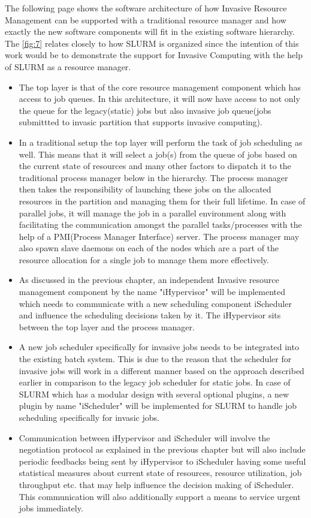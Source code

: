 The following page shows the software architecture of how Invasive Resource Management can be supported with a traditional resource manager and how exactly the new software components will fit in the existing software hierarchy. The \ref{fig:7} relates closely to how SLURM is organized since the intention of this work would be to demonstrate the support for Invasive Computing with the help of SLURM as a resource manager.
\begin{itemize}
\item The top layer is that of the core resource management component which has access to job queues. In this architecture, it will now have access to not only the queue for the legacy(static) jobs but also invasive job queue(jobs submittted to invasic partition that supports invasive computing).
\item In a traditional setup the top layer will perform the task of job scheduling as well. This means that it will select a job(s) from the queue of jobs based on the current state of resources and many other factors to dispatch it to the traditional process manager below in the hierarchy. The process manager then takes the responsibility of launching these jobs on the allocated resources in the partition and managing them for their full lifetime. In case of parallel jobs, it will manage the job in a parallel environment along with facilitating the communication amongst the parallel tasks/processes with the help of a PMI(Process Manager Interface) server. The process manager may also spawn slave daemons on each of the nodes which are a part of the resource allocation for a single job to manage them more effectively.
\item As discussed in the previous chapter, an independent Invasive resource management component by the name "iHypervisor" will be implemented which needs to communicate with a new scheduling component iScheduler and influence the scheduling decisions taken by it. The iHypervisor sits between the top layer and the process manager.
\item A new job scheduler specifically for invasive jobs needs to be integrated into the existing batch system. This is due to the reason that the scheduler for invasive jobs will work in a different manner based on the approach described earlier in comparison to the legacy job scheduler for static jobs. In case of SLURM which has a modular design with several optional plugins, a new plugin by name "iScheduler" will be implemented for SLURM to handle job scheduling specifically for invasic jobs.
\item Communication between iHypervisor and iScheduler will involve the negotiation protocol as explained in the previous chapter but will also include periodic feedbacks being sent by iHypervisor to iScheduler having some useful statistical measures about current state of resources, resource utilization, job throughput etc. that may help influence the decision making of iScheduler. This communication will also additionally support a means to service urgent jobs immediately.
\end{itemize}
